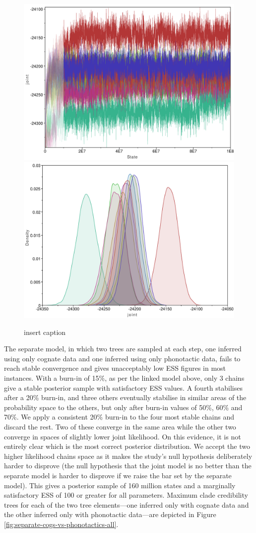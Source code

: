 \documentclass[]{article}
\begin{document}
\begin{figure}
\includegraphics[width=0.5\linewidth]{fig/joint_trace_ch1-10} \includegraphics[width=0.5\linewidth]{fig/joint_trace_dens_ch1-10} \caption{insert caption}\label{fig:linked-all-trace}
\end{figure}

The separate model, in which two trees are sampled at each step, one inferred using only cognate data and one inferred using only phonotactic data, fails to reach stable convergence and gives unacceptably low ESS figures in most instances. With a burn-in of 15\%, as per the linked model above, only 3 chains give a stable posterior sample with satisfactory ESS values. A fourth stabilises after a 20\% burn-in, and three others eventually stabilise in similar areas of the probability space to the others, but only after burn-in values of 50\%, 60\% and 70\%. We apply a consistent 20\% burn-in to the four most stable chains and discard the rest. Two of these converge in the same area while the other two converge in spaces of slightly lower joint likelihood. On this evidence, it is not entirely clear which is the most correct posterior distribution. We accept the two higher likelihood chains space as it makes the study's null hypothesis deliberately harder to disprove (the null hypothesis that the joint model is no better than the separate model is harder to disprove if we raise the bar set by the separate model). This gives a posterior sample of 160 million states and a marginally satisfactory ESS of 100 or greater for all parameters. Maximum clade credibility trees for each of the two tree elements---one inferred only with cognate data and the other inferred only with phonotactic data---are depicted in Figure \ref{fig:separate-cogs-vs-phonotactics-all}.
\end{document}

